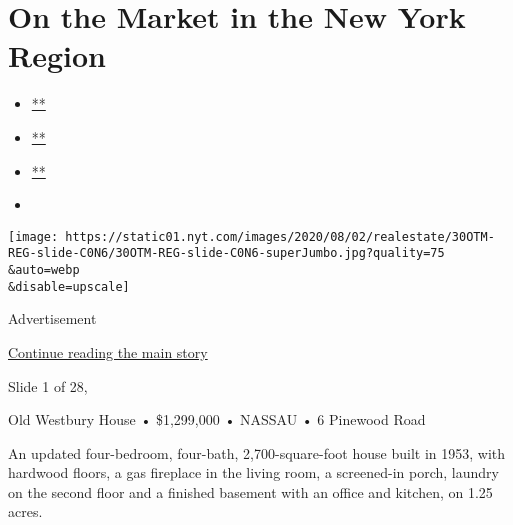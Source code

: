 \hypertarget{on-the-market-in-the-new-york-region}{%
\section{On the Market in the New York
Region}\label{on-the-market-in-the-new-york-region}}

\begin{itemize}
\item
  \href{https://www.facebook.com/sharer.php?app_id=9869919170\&u=https\%3A\%2F\%2Fwww.nytimes.com\%2Fslideshow\%2F2020\%2F07\%2F30\%2Frealestate\%2Fon-the-market-in-the-new-york-region.html\%3Fsmid\%3Dfb-share\&name=On\%20the\%20Market\%20in\%20the\%20New\%20York\%20Region\&redirect_uri=https\%3A\%2F\%2Fwww.facebook.com\%2F}{**}
\item
  \href{https://twitter.com/intent/tweet?url=https\%3A\%2F\%2Fwww.nytimes.com\%2Fslideshow\%2F2020\%2F07\%2F30\%2Frealestate\%2Fon-the-market-in-the-new-york-region.html\%3Fsmid\%3Dtw-share\&text=On\%20the\%20Market\%20in\%20the\%20New\%20York\%20Region}{**}
\item
  \href{mailto:?subject=NYTimes.com\%3A\%20On\%20the\%20Market\%20in\%20the\%20New\%20York\%20Region\&body=From\%20The\%20New\%20York\%20Times\%3A\%0A\%0AOn\%20the\%20Market\%20in\%20the\%20New\%20York\%20Region\%0A\%0AThis\%20week\%E2\%80\%99s\%20properties\%20are\%20four-bedroom\%20homes\%20in\%20Old\%20Westbury\%2C\%20N.Y.\%2C\%20and\%20Crosswicks\%2C\%20N.J.\%0A\%0Ahttps\%3A\%2F\%2Fwww.nytimes.com\%2Fslideshow\%2F2020\%2F07\%2F30\%2Frealestate\%2Fon-the-market-in-the-new-york-region.html\%3Fsmid\%3Dem-share}{**}
\item
\end{itemize}

\texttt{[image: https://static01.nyt.com/images/2020/08/02/realestate/30OTM-REG-slide-C0N6/30OTM-REG-slide-C0N6-superJumbo.jpg?quality=75\\\&auto=webp\\\&disable=upscale]}

Advertisement

\protect\hyperlink{after-right-0}{Continue reading the main story}

Slide 1 of 28,

Old Westbury House • \$1,299,000 • NASSAU • 6 Pinewood Road

An updated four-bedroom, four-bath, 2,700-square-foot house built in
1953, with hardwood floors, a gas fireplace in the living room, a
screened-in porch, laundry on the second floor and a finished basement
with an office and kitchen, on 1.25 acres.

